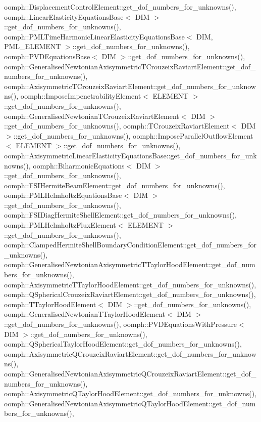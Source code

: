 oomph\+::\+Displacement\+Control\+Element\+::get\+\_\+dof\+\_\+numbers\+\_\+for\+\_\+unknowns(), oomph\+::\+Linear\+Elasticity\+Equations\+Base$<$ D\+I\+M $>$\+::get\+\_\+dof\+\_\+numbers\+\_\+for\+\_\+unknowns(), oomph\+::\+P\+M\+L\+Time\+Harmonic\+Linear\+Elasticity\+Equations\+Base$<$ D\+I\+M, P\+M\+L\+\_\+\+E\+L\+E\+M\+E\+N\+T $>$\+::get\+\_\+dof\+\_\+numbers\+\_\+for\+\_\+unknowns(), oomph\+::\+P\+V\+D\+Equations\+Base$<$ D\+I\+M $>$\+::get\+\_\+dof\+\_\+numbers\+\_\+for\+\_\+unknowns(), oomph\+::\+Generalised\+Newtonian\+Axisymmetric\+T\+Crouzeix\+Raviart\+Element\+::get\+\_\+dof\+\_\+numbers\+\_\+for\+\_\+unknowns(), oomph\+::\+Axisymmetric\+T\+Crouzeix\+Raviart\+Element\+::get\+\_\+dof\+\_\+numbers\+\_\+for\+\_\+unknowns(), oomph\+::\+Impose\+Impenetrability\+Element$<$ E\+L\+E\+M\+E\+N\+T $>$\+::get\+\_\+dof\+\_\+numbers\+\_\+for\+\_\+unknowns(), oomph\+::\+Generalised\+Newtonian\+T\+Crouzeix\+Raviart\+Element$<$ D\+I\+M $>$\+::get\+\_\+dof\+\_\+numbers\+\_\+for\+\_\+unknowns(), oomph\+::\+T\+Crouzeix\+Raviart\+Element$<$ D\+I\+M $>$\+::get\+\_\+dof\+\_\+numbers\+\_\+for\+\_\+unknowns(), oomph\+::\+Impose\+Parallel\+Outflow\+Element$<$ E\+L\+E\+M\+E\+N\+T $>$\+::get\+\_\+dof\+\_\+numbers\+\_\+for\+\_\+unknowns(), oomph\+::\+Axisymmetric\+Linear\+Elasticity\+Equations\+Base\+::get\+\_\+dof\+\_\+numbers\+\_\+for\+\_\+unknowns(), oomph\+::\+Biharmonic\+Equations$<$ D\+I\+M $>$\+::get\+\_\+dof\+\_\+numbers\+\_\+for\+\_\+unknowns(), oomph\+::\+F\+S\+I\+Hermite\+Beam\+Element\+::get\+\_\+dof\+\_\+numbers\+\_\+for\+\_\+unknowns(), oomph\+::\+P\+M\+L\+Helmholtz\+Equations\+Base$<$ D\+I\+M $>$\+::get\+\_\+dof\+\_\+numbers\+\_\+for\+\_\+unknowns(), oomph\+::\+F\+S\+I\+Diag\+Hermite\+Shell\+Element\+::get\+\_\+dof\+\_\+numbers\+\_\+for\+\_\+unknowns(), oomph\+::\+P\+M\+L\+Helmholtz\+Flux\+Element$<$ E\+L\+E\+M\+E\+N\+T $>$\+::get\+\_\+dof\+\_\+numbers\+\_\+for\+\_\+unknowns(), oomph\+::\+Clamped\+Hermite\+Shell\+Boundary\+Condition\+Element\+::get\+\_\+dof\+\_\+numbers\+\_\+for\+\_\+unknowns(), oomph\+::\+Generalised\+Newtonian\+Axisymmetric\+T\+Taylor\+Hood\+Element\+::get\+\_\+dof\+\_\+numbers\+\_\+for\+\_\+unknowns(), oomph\+::\+Axisymmetric\+T\+Taylor\+Hood\+Element\+::get\+\_\+dof\+\_\+numbers\+\_\+for\+\_\+unknowns(), oomph\+::\+Q\+Spherical\+Crouzeix\+Raviart\+Element\+::get\+\_\+dof\+\_\+numbers\+\_\+for\+\_\+unknowns(), oomph\+::\+T\+Taylor\+Hood\+Element$<$ D\+I\+M $>$\+::get\+\_\+dof\+\_\+numbers\+\_\+for\+\_\+unknowns(), oomph\+::\+Generalised\+Newtonian\+T\+Taylor\+Hood\+Element$<$ D\+I\+M $>$\+::get\+\_\+dof\+\_\+numbers\+\_\+for\+\_\+unknowns(), oomph\+::\+P\+V\+D\+Equations\+With\+Pressure$<$ D\+I\+M $>$\+::get\+\_\+dof\+\_\+numbers\+\_\+for\+\_\+unknowns(), oomph\+::\+Q\+Spherical\+Taylor\+Hood\+Element\+::get\+\_\+dof\+\_\+numbers\+\_\+for\+\_\+unknowns(), oomph\+::\+Axisymmetric\+Q\+Crouzeix\+Raviart\+Element\+::get\+\_\+dof\+\_\+numbers\+\_\+for\+\_\+unknowns(), oomph\+::\+Generalised\+Newtonian\+Axisymmetric\+Q\+Crouzeix\+Raviart\+Element\+::get\+\_\+dof\+\_\+numbers\+\_\+for\+\_\+unknowns(), oomph\+::\+Axisymmetric\+Q\+Taylor\+Hood\+Element\+::get\+\_\+dof\+\_\+numbers\+\_\+for\+\_\+unknowns(), oomph\+::\+Generalised\+Newtonian\+Axisymmetric\+Q\+Taylor\+Hood\+Element\+::get\+\_\+dof\+\_\+numbers\+\_\+for\+\_\+unknowns(), 